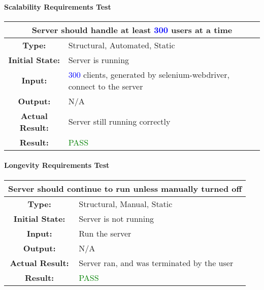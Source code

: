 \documentclass[12pt, titlepage]{article}
\newcommand{\numberOfStressTestClients}{\textcolor{blue}{300 }}
\begin{document}
\paragraph{Scalability Requirements Test}

\begin{center}
\begin{table}[H]
\begin{tabularx}{\textwidth}{| c X |}
\hline
\multicolumn{2}{|c|}{\textbf{Server should handle at least \numberOfStressTestClients users at a time}}\\
\hline
\textbf{Type: } & Structural, Automated, Static\\
\textbf{Initial State: } & Server is running\\
\textbf{Input: } & \numberOfStressTestClients clients, generated by selenium-webdriver, connect to the server\\
\textbf{Output: } & N/A \\
\textbf{Actual Result:  } & Server still running correctly \\
\textbf{Result: } & \textcolor{green}{PASS}\\
\hline
\end{tabularx}
\end{table}
\end{center}

\paragraph{Longevity Requirements Test}

\begin{center}
\begin{table}[H]
\begin{tabularx}{\textwidth}{| c X |}
\hline
\multicolumn{2}{|c|}{\textbf{Server should continue to run unless manually turned off}}\\
\hline
\textbf{Type: } & Structural, Manual, Static\\
\textbf{Initial State: } & Server is not running\\
\textbf{Input: } & Run the server\\
\textbf{Output: } & N/A \\
\textbf{Actual Result:  } & Server ran, and was terminated by the user \\
\textbf{Result: } & \textcolor{green}{PASS}\\
\hline
\end{tabularx}
\end{table}
\end{center}
\end{document}
